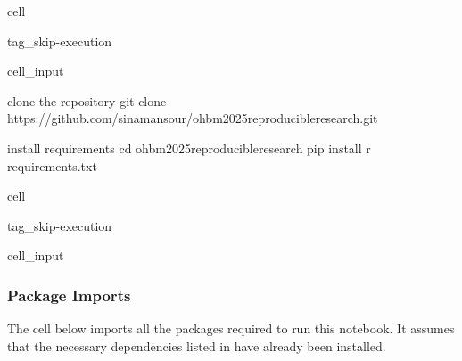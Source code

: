 \documentclass[letterpaper,10pt,english]{jupyterBook}
\begin{document}
\begin{sphinxuseclass}{cell}
\begin{sphinxuseclass}{tag_skip-execution}\begin{sphinxVerbatimInput}

\begin{sphinxuseclass}{cell_input}
\begin{sphinxVerbatim}[commandchars=\\\{\}]

\PYGZsh{} clone the repository
git clone https://github.com/sina\PYGZhy{}mansour/ohbm2025\PYGZhy{}reproducible\PYGZhy{}research.git

\PYGZsh{} install requirements
cd \PYGZdq{}ohbm2025\PYGZhy{}reproducible\PYGZhy{}research\PYGZdq{}
pip install \PYGZhy{}r requirements.txt
\end{sphinxVerbatim}

\end{sphinxuseclass}\end{sphinxVerbatimInput}

\end{sphinxuseclass}
\end{sphinxuseclass}
\begin{sphinxuseclass}{cell}
\begin{sphinxuseclass}{tag_skip-execution}\begin{sphinxVerbatimInput}

\begin{sphinxuseclass}{cell_input}
\begin{sphinxVerbatim}[commandchars=\\\{\}]

\end{sphinxVerbatim}

\end{sphinxuseclass}\end{sphinxVerbatimInput}

\end{sphinxuseclass}
\end{sphinxuseclass}

\subsubsection{Package Imports}
\label{\detokenize{chapters/03/03c_visualization-examples:package-imports}}
\sphinxAtStartPar
The cell below imports all the packages required to run this notebook. It assumes that the necessary dependencies listed in  have already been installed.
\end{document}
